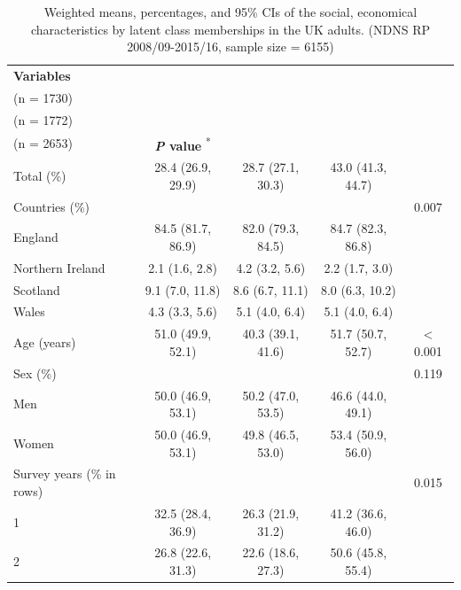 \begin{table}[H]

\caption{\label{tab:Level2tab1}Weighted means, percentages, and
95\% CIs of the social, economical characteristics by latent class memberships in the UK
adults. (NDNS RP 2008/09-2015/16, sample size = 6155)} \centering
\fontsize{9}{11}\selectfont

\begin{tabular}[t]{lcccc}
	\hiderowcolors
	\toprule
	\textbf{Variables} & \textbf{\Centerstack{Individual class 1\\(n = 1730)}} & \textbf{\Centerstack{Individual class 2\\(n = 1772)}} & \textbf{\Centerstack{Individual class 3\\(n = 2653)}} & \textbf{\textit{P} value} \textsuperscript{*}\\
	\midrule
	\showrowcolors
	Total (\%) & 28.4 (26.9, 29.9) & 28.7 (27.1, 30.3) & 43.0 (41.3, 44.7) & \\
	Countries (\%) &  &  &  & 0.007\\
	\hspace{1em}England & 84.5 (81.7, 86.9) & 82.0 (79.3, 84.5) & 84.7 (82.3, 86.8) & \\
	\hspace{1em}Northern Ireland & 2.1 (1.6, 2.8) & 4.2 (3.2, 5.6) & 2.2 (1.7, 3.0) & \\
	\hspace{1em}Scotland & 9.1 (7.0, 11.8) & 8.6 (6.7, 11.1) & 8.0 (6.3, 10.2) & \\
	\hspace{1em}Wales & 4.3 (3.3, 5.6) & 5.1 (4.0, 6.4) & 5.1 (4.0, 6.4) & \\
	Age (years) & 51.0 (49.9, 52.1) & 40.3 (39.1, 41.6) & 51.7 (50.7, 52.7) & < 0.001\\
	Sex (\%) &  &  &  & 0.119\\
	\hspace{1em}Men & 50.0 (46.9, 53.1) & 50.2 (47.0, 53.5) & 46.6 (44.0, 49.1) & \\
	\hspace{1em}Women & 50.0 (46.9, 53.1) & 49.8 (46.5, 53.0) & 53.4 (50.9, 56.0) & \\
	Survey years (\% in rows) &  &  &  & 0.015\\
	\hspace{1em}1 & 32.5 (28.4, 36.9) & 26.3 (21.9, 31.2) & 41.2 (36.6, 46.0) & \\
	\hspace{1em}2 & 26.8 (22.6, 31.3) & 22.6 (18.6, 27.3) & 50.6 (45.8, 55.4) & \\

\end{tabular}
\end{table}

